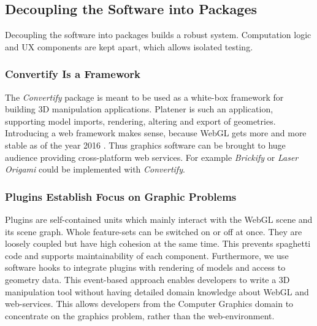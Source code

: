 \documentclass[../ClassicThesis.tex]{subfiles}
\begin{document}
\subsection{Decoupling the Software into Packages}

Decoupling the software into packages builds a robust system. Computation logic
and UX components are kept apart, which allows isolated testing.

\subsubsection{Convertify Is a Framework}

The \emph{Convertify} package is meant to be used as a white-box framework for building
3D manipulation applications. Platener is such an application, supporting model
imports, rendering, altering and export of geometries. Introducing a web
framework makes sense, because WebGL gets more and more stable as of the year
2016 . Thus graphics software can be brought to huge
audience providing cross-platform web services. For example \emph{Brickify} or \emph{Laser
Origami} could be implemented with \emph{Convertify}.


\subsubsection{Plugins Establish Focus on Graphic Problems}

Plugins are self-contained units which mainly interact with the WebGL scene and
its scene graph. Whole feature-sets can be switched on or off at once. They are
loosely coupled but have high cohesion at the same time. This prevents spaghetti
code and supports maintainability of each component. Furthermore, we use
software hooks to integrate plugins with rendering of models and access to
geometry data. This event-based approach enables developers to write a 3D
manipulation tool without having detailed domain knowledge about WebGL and
web-services. This allows developers from the Computer Graphics domain to
concentrate on the graphics problem, rather than the web-environment.
\end{document}
